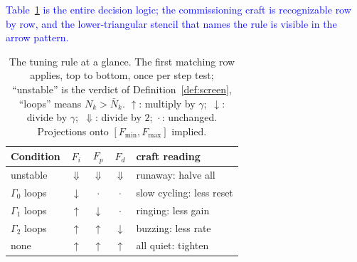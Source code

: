 \documentclass[final,3p,times,twocolumn]{elsarticle}
\newcommand{\revc}[1]{\textcolor{blue}{#1}} %
\begin{document}
\revc{Table~\ref{tab:rule} is the entire decision logic; the
commissioning craft is recognizable row by row, and the
lower-triangular stencil that names the rule is visible in the arrow
pattern.}

\begin{table}[h]
\centering
\caption{The tuning rule at a glance. The first matching row applies,
top to bottom, once per step test; ``unstable'' is the verdict of
Definition~\ref{def:screen}, ``loops'' means $N_k > \bar N_k$.
$\uparrow$: multiply by $\gamma$;\ $\downarrow$: divide by $\gamma$;\
$\Downarrow$: divide by $2$;\
$\cdot$\,: unchanged. Projections onto $[F_{\min},F_{\max}]$ implied.}
\label{tab:rule}
\setlength{\tabcolsep}{5pt}
\begin{tabular}{lcccl}
\toprule
Condition & $F_i$ & $F_p$ & $F_d$ & craft reading \\
\midrule
unstable & $\Downarrow$ & $\Downarrow$ & $\Downarrow$ &
runaway: halve all \\
$\Gamma_0$ loops & $\downarrow$ & $\cdot$ & $\cdot$ &
slow cycling: less reset \\
$\Gamma_1$ loops & $\uparrow$ & $\downarrow$ & $\cdot$ &
ringing: less gain \\
$\Gamma_2$ loops & $\uparrow$ & $\uparrow$ & $\downarrow$ &
buzzing: less rate \\
none & $\uparrow$ & $\uparrow$ & $\uparrow$ &
all quiet: tighten \\
\bottomrule
\end{tabular}
\end{table}

\begin{center}
\end{center}
\end{document}
